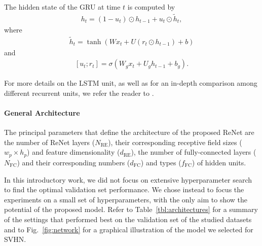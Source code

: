 \documentclass{article} \usepackage{nips15submit_e,times}
\begin{document}
The hidden state of the GRU at time $t$ is computed by
\begin{align*}
    h_t = (1-u_t) \odot h_{t-1} + u_t \odot \tilde{h}_t,
\end{align*}
where
\begin{align*}
    \tilde{h}_t = \tanh\left( W x_t + U (r_t \odot h_{t-1}) + b \right)
\end{align*}
and
\begin{align*}
    \left[ u_t; r_t\right] = \sigma\left( W_g x_t + U_g h_{t-1} + b_g\right).
\end{align*} 

For more details on the LSTM unit, as well as for an in-depth comparison among 
different recurrent units, we refer the reader to \citep{Chung2015}.

\paragraph{General Architecture}

The principal parameters that define the architecture of the proposed ReNet are 
the number of ReNet layers ($N_{\text{RE}}$), their corresponding receptive field 
sizes ($w_p \times h_p$) and feature dimensionality ($d_{\text{RE}}$), 
the number of fully-connected layers ($N_{\text{FC}}$) and their corresponding 
numbers ($d_{\text{FC}}$) and types ($f_{\text{FC}}$) of hidden units. 

In this introductory work, we did not focus on extensive hyperparameter
search to find the optimal validation set 
performance. We chose instead to focus the experiments on a small set of 
hyperparameters, with the only aim to show the potential of the proposed model.
Refer to Table~\ref{tbl:architectures} for a summary of the settings that performed 
best on the validation set of the studied datasets and to Fig.~\ref{fig:network}
for a graphical illustration of the model we selected for SVHN.
\end{document}

